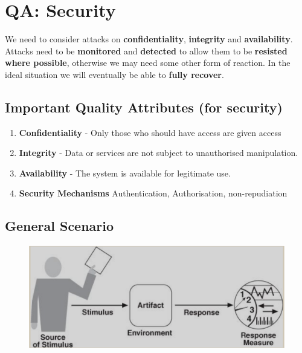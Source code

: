 \documentclass[a4paper]{article}
\begin{document}
\newpage
\section{QA: Security}
We need to consider attacks on \textbf{confidentiality}, \textbf{integrity} and \textbf{availability}. 
Attacks need to be \textbf{monitored} and \textbf{detected} to allow them to be \textbf{resisted where possible}, otherwise we may need some other form of reaction. In the ideal situation we will eventually be able to \textbf{fully recover}.

\subsection{Important Quality Attributes (for security)}
\begin{enumerate}
\item \textbf{Confidentiality} - Only those who should have access are given access
\item \textbf{Integrity} -  Data or services are not subject to unauthorised manipulation.
\item \textbf{Availability} -  The system is available for legitimate use.
\item \textbf{Security Mechanisms} Authentication, Authorisation, non-repudiation
\end{enumerate}

\subsection{General Scenario}
\begin{figure}[h]
\centering 
\includegraphics[scale=0.3]{images/genreralqascenario.png}
\end{figure}
\end{document}
